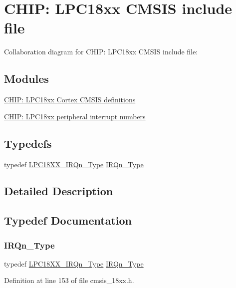 \hypertarget{group___c_m_s_i_s__18_x_x}{}\section{C\+H\+IP\+: L\+P\+C18xx C\+M\+S\+IS include file}
\label{group___c_m_s_i_s__18_x_x}
Collaboration diagram for C\+H\+IP\+: L\+P\+C18xx C\+M\+S\+IS include file\+:
\subsection*{Modules}
\begin{DoxyCompactItemize}
\item 
\hyperlink{group___c_m_s_i_s__18_x_x___c_o_m_m_o_n}{C\+H\+I\+P\+: L\+P\+C18xx Cortex C\+M\+S\+I\+S definitions}
\item 
\hyperlink{group___c_m_s_i_s__18_x_x___i_r_q}{C\+H\+I\+P\+: L\+P\+C18xx peripheral interrupt numbers}
\end{DoxyCompactItemize}
\subsection*{Typedefs}
\begin{DoxyCompactItemize}
\item 
typedef \hyperlink{group___c_m_s_i_s__18_x_x___i_r_q_gaa44deabd252bda567898bae35a086adc}{L\+P\+C18\+X\+X\+\_\+\+I\+R\+Qn\+\_\+\+Type} \hyperlink{group___c_m_s_i_s__18_x_x_ga05b7a1270df5ec5a74fa3210e16be1e0}{I\+R\+Qn\+\_\+\+Type}
\end{DoxyCompactItemize}


\subsection{Detailed Description}


\subsection{Typedef Documentation}
\mbox{\label{group___c_m_s_i_s__18_x_x_ga05b7a1270df5ec5a74fa3210e16be1e0}} 
\subsubsection{\texorpdfstring{I\+R\+Qn\+\_\+\+Type}{IRQn\_Type}}
{\footnotesize\ttfamily typedef \hyperlink{group___c_m_s_i_s__18_x_x___i_r_q_gaa44deabd252bda567898bae35a086adc}{L\+P\+C18\+X\+X\+\_\+\+I\+R\+Qn\+\_\+\+Type} \hyperlink{group___c_m_s_i_s__18_x_x___i_r_q_gaa44deabd252bda567898bae35a086adc}{I\+R\+Qn\+\_\+\+Type}}



Definition at line 153 of file cmsis\+\_\+18xx.\+h.

